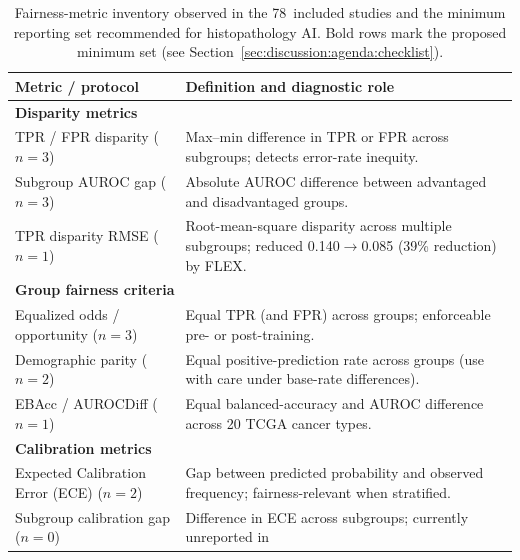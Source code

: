 \begin{table}[htbp]
  \centering
    \caption{Fairness-metric inventory observed in the 78~included
           studies and the minimum reporting set recommended for
           histopathology AI.  Bold rows mark the proposed minimum
           set (see Section~\ref{sec:discussion:agenda:checklist}).}
  \label{tab:fairness_metrics}
  \small
  \begin{tabularx}{\linewidth}{@{}p{7.6cm} X@{}}
    \toprule
    \textbf{Metric / protocol} &
      \textbf{Definition and diagnostic role} \\
    \midrule
    \multicolumn{2}{l}{\textbf{Disparity metrics}} \\
    TPR / FPR disparity ($n=3$) \citep{vaidya2024demographic,huang2025knowledge,soltan2024challenges} &
      Max--min difference in TPR or FPR across subgroups;
      detects error-rate inequity. \\
    Subgroup AUROC gap ($n=3$) \citep{vaidya2024demographic,lin2025contrastive,huang2025knowledge} &
      Absolute AUROC difference between advantaged and disadvantaged
      groups. \\
    TPR disparity RMSE ($n=1$) \citep{huang2025knowledge} &
      Root-mean-square disparity across multiple subgroups;
      reduced 0.140$\to$0.085 (39\% reduction) by FLEX. \\
    \midrule
    \multicolumn{2}{l}{\textbf{Group fairness criteria}} \\
    Equalized odds / opportunity ($n=3$) \citep{soltan2024challenges,sufian2024mitigating,cecconi2024fairness} &
      Equal TPR (and FPR) across groups; enforceable pre- or
      post-training. \\
    Demographic parity ($n=2$) \citep{soltan2024challenges,lin2025contrastive} &
      Equal positive-prediction rate across groups (use with care
      under base-rate differences). \\
    EBAcc / AUROCDiff ($n=1$) \citep{lin2025contrastive} &
      Equal balanced-accuracy and AUROC difference across 20 TCGA
      cancer types. \\
    \midrule
    \multicolumn{2}{l}{\textbf{Calibration metrics}} \\
    Expected Calibration Error (ECE) ($n=2$) \citep{roschewitz2023automatic,park2025uncertainty} &
      Gap between predicted probability and observed frequency;
      fairness-relevant when stratified. \\
    Subgroup calibration gap ($n=0$) &
      Difference in ECE across subgroups; currently unreported in

\end{tabularx}
\end{table}
